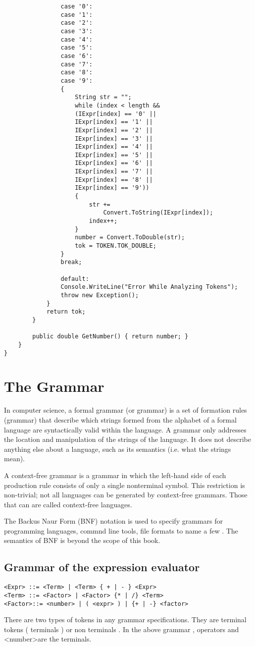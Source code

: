 \begin{lstlisting}
				case '0':
				case '1':
				case '2':
				case '3':
				case '4':
				case '5':
				case '6':
				case '7':
				case '8':
				case '9':
				{
					String str = "";
					while (index < length &&
					(IExpr[index] == '0' ||
					IExpr[index] == '1' ||
					IExpr[index] == '2' ||
					IExpr[index] == '3' ||
					IExpr[index] == '4' ||
					IExpr[index] == '5' ||
					IExpr[index] == '6' ||
					IExpr[index] == '7' ||
					IExpr[index] == '8' ||
					IExpr[index] == '9'))
					{
						str += 
							Convert.ToString(IExpr[index]);
						index++;
					}
					number = Convert.ToDouble(str);
					tok = TOKEN.TOK_DOUBLE;
				}
				break;
				
				default:
				Console.WriteLine("Error While Analyzing Tokens");
				throw new Exception();
			}
			return tok;
		}
		
		public double GetNumber() { return number; }
	}
}
\end{lstlisting}

\section{The Grammar}
In computer science, a formal grammar (or grammar) is a set of formation rules (grammar) that describe which strings formed from the alphabet of a formal language are syntactically valid within the language. A grammar only addresses the location and manipulation of the strings of the language. It does not describe anything else about a language, such as its semantics (i.e. what the strings mean).

A context-free grammar is a grammar in which the left-hand side of each production rule consists of only a single nonterminal symbol. This restriction is non-trivial; not all languages can be generated by context-free grammars. Those that can are called context-free languages.

The Backus Naur Form (BNF) notation is used to specify grammars for programming languages, commnd line tools, file formats to name a few . The semantics of BNF is beyond the scope of this book.

\subsection{Grammar of the expression evaluator}
\lstset{style=csharp}
\begin{lstlisting}
<Expr> ::= <Term> | <Term> { + | - } <Expr>
<Term> ::= <Factor> | <Factor> {* | /} <Term>
<Factor>::= <number> | ( <expr> ) | {+ | -} <factor>
\end{lstlisting}
There are two types of tokens in any grammar specifications. They are terminal tokens ( terminals ) or non terminals . In the above grammar , operators and \textless number\textgreater are the terminals.

